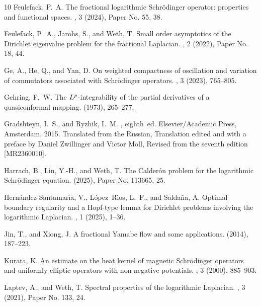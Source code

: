 \documentclass[10pt, a4paper, reqno]{amsart}
\theoremstyle{definition}
\theoremstyle{remark}
\numberwithin{equation}{section}
\begin{document}
\begin{thebibliography}{10}
{\sc Feulefack, P.~A.}
\newblock The fractional logarithmic {S}chr\"{o}dinger operator: properties and functional spaces.
, 3 (2024), Paper No. 55, 38.

{\sc Feulefack, P.~A., Jarohs, S., and Weth, T.}
\newblock Small order asymptotics of the {D}irichlet eigenvalue problem for the fractional {L}aplacian.
, 2 (2022), Paper No. 18, 44.

{\sc Ge, A., He, Q., and Yan, D.}
\newblock On weighted compactness of oscillation and variation of commutators associated with {S}chr\"{o}dinger operators.
, 3 (2023), 765--805.

{\sc Gehring, F.~W.}
\newblock The {$L\sp{p}$}-integrability of the partial derivatives of a quasiconformal mapping.
 (1973), 265--277.

{\sc Gradshteyn, I.~S., and Ryzhik, I.~M.}
, eighth~ed.
\newblock Elsevier/Academic Press, Amsterdam, 2015.
\newblock Translated from the Russian, Translation edited and with a preface by Daniel Zwillinger and Victor Moll, Revised from the seventh edition [MR2360010].

{\sc Harrach, B., Lin, Y.-H., and Weth, T.}
\newblock The {C}alder\'{o}n problem for the logarithmic {S}chr\"{o}dinger equation.
 (2025), Paper No. 113665, 25.

{\sc Hern\'{a}ndez-Santamar\'{\i}a, V., L\'{o}pez~R\'{\i}os, L.~F., and Salda\~{n}a, A.}
\newblock Optimal boundary regularity and a {H}opf-type lemma for {D}irichlet problems involving the logarithmic {L}aplacian.
, 1 (2025), 1--36.

{\sc Jin, T., and Xiong, J.}
\newblock A fractional {Y}amabe flow and some applications.
 (2014), 187--223.

{\sc Kurata, K.}
\newblock An estimate on the heat kernel of magnetic {S}chr\"{o}dinger operators and uniformly elliptic operators with non-negative potentials.
, 3 (2000), 885--903.

{\sc Laptev, A., and Weth, T.}
\newblock Spectral properties of the logarithmic {L}aplacian.
, 3 (2021), Paper No. 133, 24.


\end{thebibliography}
\end{document}
